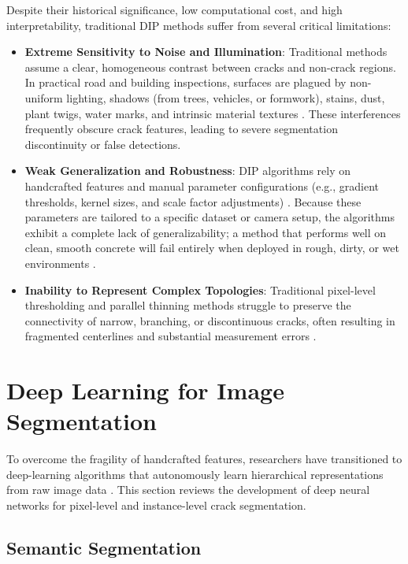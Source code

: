 Despite their historical significance, low computational cost, and high interpretability, traditional DIP methods suffer from several critical limitations:
\begin{itemize}
    \item \textbf{Extreme Sensitivity to Noise and Illumination}: Traditional methods assume a clear, homogeneous contrast between cracks and non-crack regions. In practical road and building inspections, surfaces are plagued by non-uniform lighting, shadows (from trees, vehicles, or formwork), stains, dust, plant twigs, water marks, and intrinsic material textures \cite{liu-2019,kirchhoff-2024,sohaib-2024,zhang-2024c}. These interferences frequently obscure crack features, leading to severe segmentation discontinuity or false detections.
    \item \textbf{Weak Generalization and Robustness}: DIP algorithms rely on handcrafted features and manual parameter configurations (e.g., gradient thresholds, kernel sizes, and scale factor adjustments) \cite{zhang-2024a}. Because these parameters are tailored to a specific dataset or camera setup, the algorithms exhibit a complete lack of generalizability; a method that performs well on clean, smooth concrete will fail entirely when deployed in rough, dirty, or wet environments \cite{liu-2019}.
    \item \textbf{Inability to Represent Complex Topologies}: Traditional pixel-level thresholding and parallel thinning methods struggle to preserve the connectivity of narrow, branching, or discontinuous cracks, often resulting in fragmented centerlines and substantial measurement errors \cite{liu-2019,zhang-2025,zhang-2024b}.
\end{itemize}

\section{Deep Learning for Image Segmentation}

\hs To overcome the fragility of handcrafted features, researchers have transitioned to deep-learning algorithms that autonomously learn hierarchical representations from raw image data \cite{zhang-2024a}. This section reviews the development of deep neural networks for pixel-level and instance-level crack segmentation.

\subsection{Semantic Segmentation}

